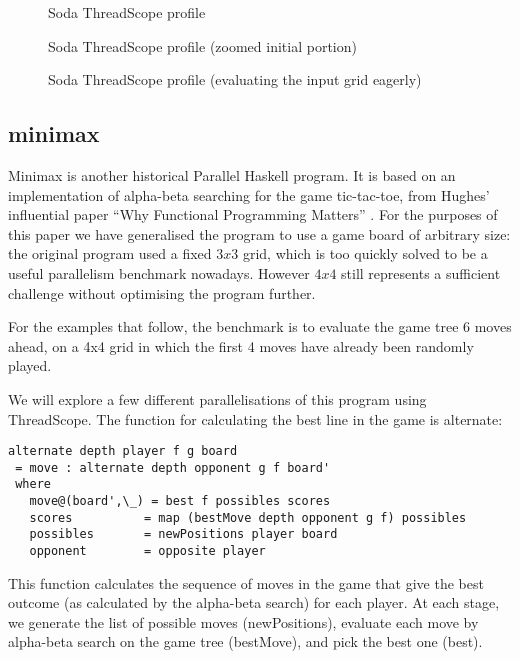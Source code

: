 \documentclass[twocolumn,9pt]{sigplanconf}
\newcommand{\codef}[1]{{\fontfamily{cmss}\small#1}}
\begin{document}
\begin{figure}
\caption{Soda ThreadScope profile}
\label{f:soda-threadscope}
\end{figure}

\begin{figure}
\caption{Soda ThreadScope profile (zoomed initial portion)}
\label{f:soda-threadscope2}
\end{figure}

\begin{figure}
\caption{Soda ThreadScope profile (evaluating the input grid eagerly)}
\label{f:soda-threadscope3}
\end{figure}

\subsection{minimax}

Minimax is another historical Parallel Haskell program.  It is based
on an implementation of alpha-beta searching for the game tic-tac-toe,
from Hughes' influential paper ``Why Functional Programming Matters''
\cite{why}.  For the purposes of this paper we have generalised the
program to use a game board of arbitrary size: the original program
used a fixed $3x3$ grid, which is too quickly solved to be a useful
parallelism benchmark nowadays.  However $4x4$ still represents a
sufficient challenge without optimising the program further.

For the examples that follow, the benchmark is to evaluate the game
tree 6 moves ahead, on a 4x4 grid in which the first 4 moves have
already been randomly played.

We will explore a few different parallelisations of this program using
ThreadScope.  The function for calculating the best line in the game
is \codef{alternate}:

\begin{lstlisting}
alternate depth player f g board
 = move : alternate depth opponent g f board'
 where
   move@(board',\_) = best f possibles scores
   scores          = map (bestMove depth opponent g f) possibles
   possibles       = newPositions player board
   opponent        = opposite player
\end{lstlisting}

This function calculates the sequence of moves in the game that give
the best outcome (as calculated by the alpha-beta search) for each
player.  At each stage, we generate the list of possible moves
(\codef{newPositions}), evaluate each move by alpha-beta search on the
game tree (\codef{bestMove}), and pick the best one (\codef{best}).
\end{document}
